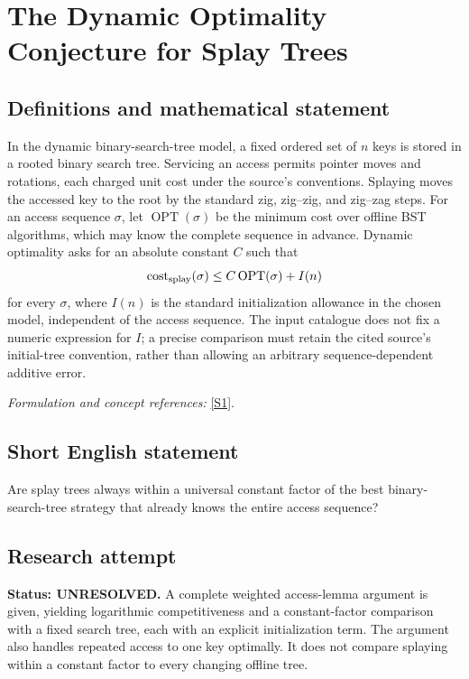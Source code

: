 \documentclass[11pt]{article}
\begin{document}
\section*{\texorpdfstring{The Dynamic Optimality Conjecture for Splay Trees}{The Dynamic Optimality Conjecture for Splay Trees}}\label{306}
\subsection{Definitions and mathematical statement}
In the dynamic binary-search-tree model, a fixed ordered set of $n$ keys is stored in a rooted binary search tree. Servicing an access permits pointer moves and rotations, each charged unit cost under the source's conventions. Splaying moves the accessed key to the root by the standard zig, zig--zig, and zig--zag steps. For an access sequence $\sigma$, let $\operatorname{OPT}(\sigma)$ be the minimum cost over offline BST algorithms, which may know the complete sequence in advance. Dynamic optimality asks for an absolute constant $C$ such that
\[
 \operatorname{cost}_{\rm splay}(\sigma)
 \le C\operatorname{OPT}(\sigma)+I(n)
\]
for every $\sigma$, where $I(n)$ is the standard initialization allowance in the chosen model, independent of the access sequence. The input catalogue does not fix a numeric expression for $I$; a precise comparison must retain the cited source's initial-tree convention, rather than allowing an arbitrary sequence-dependent additive error.
\par\smallskip\textit{Formulation and concept references:} \href{https://arxiv.org/abs/2607.18498}{[S1]}.

\subsection{Short English statement}
Are splay trees always within a universal constant factor of the best binary-search-tree strategy that already knows the entire access sequence?
\subsection{Research attempt}
\textbf{Status: UNRESOLVED.} A complete weighted access-lemma argument is given, yielding logarithmic competitiveness and a constant-factor comparison with a fixed search tree, each with an explicit initialization term. The argument also handles repeated access to one key optimally. It does not compare splaying within a constant factor to every changing offline tree.
\end{document}

